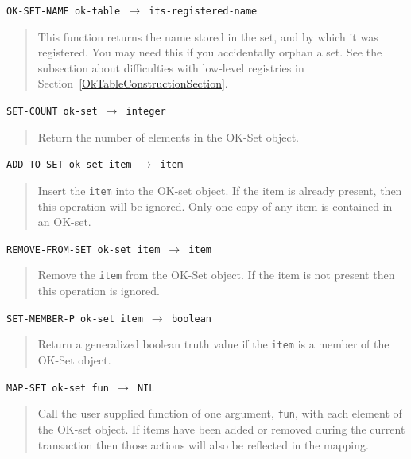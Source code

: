 \documentclass[article,oneside]{memoir}
\begin{document}
\noindent \texttt{OK-SET-NAME ok-table $\rightarrow$ its-registered-name}

\begin{quote}
This function returns the name stored in the set, and by which it was registered. You may need this if you accidentally orphan a set. See the subsection about difficulties with low-level registries in Section~\ref{OkTableConstructionSection}.
\end{quote}

\noindent \texttt{SET-COUNT ok-set $\rightarrow$ integer}

\begin{quote}
Return the number of elements in the OK-Set object.
\end{quote}

\noindent \texttt{ADD-TO-SET ok-set item $\rightarrow$ item}

\begin{quote}
Insert the \texttt{item} into the OK-set object. If the item is already present, then this operation will be ignored. Only one copy of any item is contained in an OK-set.
\end{quote}

\noindent \texttt{REMOVE-FROM-SET ok-set item $\rightarrow$ item}

\begin{quote}
Remove the \texttt{item} from the OK-Set object. If the item is not present then this operation is ignored. 
\end{quote}

\noindent \texttt{SET-MEMBER-P ok-set item $\rightarrow$ boolean}

\begin{quote}
Return a generalized boolean truth value if the \texttt{item} is a member of the OK-Set object.
\end{quote}

\pagebreak[2]
\noindent \texttt{MAP-SET ok-set fun $\rightarrow$ NIL}

\begin{quote}
Call the user supplied function of one argument, \texttt{fun}, with each element of the OK-set object. If items have been added or removed during the current transaction then those actions will also be reflected in the mapping. 
\end{quote}
\end{document}
